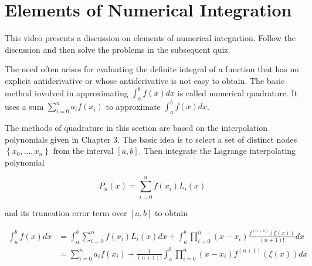 \section{Elements of Numerical Integration}

\videolesson
\begin{selfvideo}[2]
This video presents a discussion on elements of numerical integration. Follow the discussion and then solve the problems in the subsequent quiz.
\end{selfvideo}

%
%


The need often arises for evaluating the definite integral of a function that has no explicit antiderivative or whose antiderivative is not easy to obtain. The basic method involved in approximating $\int_{a}^{b} f(x) d x$ is called numerical quadrature. It uses a sum $\sum_{i=0}^{n} a_{i} f\left(x_{i}\right)$ to approximate $\int_{a}^{b} f(x) d x$.

The methods of quadrature in this section are based on the interpolation polynomials given in Chapter 3. The basic idea is to select a set of distinct nodes $\left\{x_{0}, \ldots, x_{n}\right\}$ from the interval $[a, b]$. Then integrate the Lagrange interpolating polynomial

$$
P_{n}(x)=\sum_{i=0}^{n} f\left(x_{i}\right) L_{i}(x)
$$

and its truncation error term over $[a, b]$ to obtain

$$
\begin{aligned}
\int_{a}^{b} f(x) d x & =\int_{a}^{b} \sum_{i=0}^{n} f\left(x_{i}\right) L_{i}(x) d x+\int_{a}^{b} \prod_{i=0}^{n}\left(x-x_{i}\right) \frac{f^{(n+1)}(\xi(x))}{(n+1)!} d x \\
& =\sum_{i=0}^{n} a_{i} f\left(x_{i}\right)+\frac{1}{(n+1)!} \int_{a}^{b} \prod_{i=0}^{n}\left(x-x_{i}\right) f^{(n+1)}(\xi(x)) d x
\end{aligned}
$$

